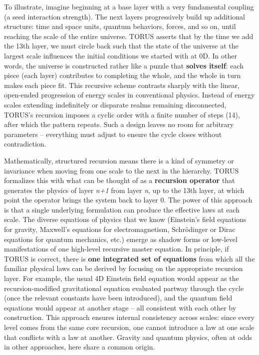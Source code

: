 \documentclass[]{article}
\begin{document}
To illustrate, imagine beginning at a base layer with a very fundamental
coupling (a seed interaction strength). The next layers progressively
build up additional structure: time and space units, quantum behaviors,
forces, and so on, until reaching the scale of the entire universe.
TORUS asserts that by the time we add the 13th layer, we must circle
back such that the state of the universe at the largest scale influences
the initial conditions we started with at 0D. In other words, the
universe is constructed rather like a puzzle that \textbf{solves
itself}: each piece (each layer) contributes to completing the whole,
and the whole in turn makes each piece fit. This recursive scheme
contrasts sharply with the linear, open-ended progression of energy
scales in conventional physics. Instead of energy scales extending
indefinitely or disparate realms remaining disconnected, TORUS's
recursion imposes a cyclic order with a finite number of steps (14),
after which the pattern repeats. Such a design leaves no room for
arbitrary parameters -- everything must adjust to ensure the cycle
closes without contradiction.

Mathematically, structured recursion means there is a kind of symmetry
or invariance when moving from one scale to the next in the hierarchy.
TORUS formalizes this with what can be thought of as a \textbf{recursion
operator} that generates the physics of layer \emph{n+1} from layer
\emph{n}, up to the 13th layer, at which point the operator brings the
system back to layer 0. The power of this approach is that a single
underlying formulation can produce the effective laws at each scale. The
diverse equations of physics that we know (Einstein's field equations
for gravity, Maxwell's equations for electromagnetism, Schrödinger or
Dirac equations for quantum mechanics, etc.) emerge as shadow forms or
low-level manifestations of one high-level recursive master equation. In
principle, if TORUS is correct, there is \textbf{one integrated set of
equations} from which all the familiar physical laws can be derived by
focusing on the appropriate recursion layer. For example, the usual 4D
Einstein field equation would appear as the recursion-modified
gravitational equation evaluated partway through the cycle (once the
relevant constants have been introduced), and the quantum field
equations would appear at another stage -- all consistent with each
other by construction. This approach ensures internal consistency across
scales: since every level comes from the same core recursion, one cannot
introduce a law at one scale that conflicts with a law at another.
Gravity and quantum physics, often at odds in other approaches, here
share a common origin.
\end{document}
